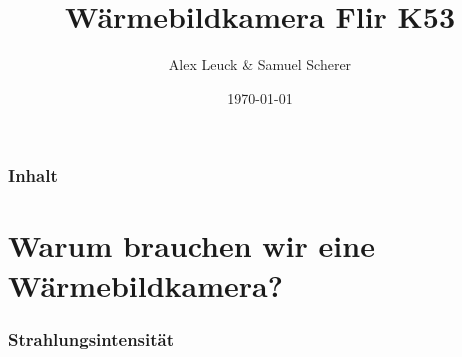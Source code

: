 \documentclass[aspectratio=169]{beamer}
\title[Wärmebildkamera]{Wärmebildkamera Flir K53} %
\author{Alex Leuck \& Samuel Scherer} %
\institute[] %
    {
    \normalsize Feuerwehr Heidelberg \\ %
    \scriptsize{Abteilung Neuenheim} \\
    \medskip
    \textit{alexander.leuck@feuerwehr-neuenheim.de \\ samuel.scherer@feuerwehr-neuenheim.de} %
    }
\date{\today} %
\begin{document}
    \begin{frame}
    \titlepage %
    \end{frame}

    \begin{frame}
    \frametitle{Inhalt} %
    \tableofcontents %
    \end{frame}


    \section{Warum brauchen wir eine Wärmebildkamera?} %


    \begin{frame}
    \frametitle{Strahlungsintensität}
    \end{frame}
\end{document}
